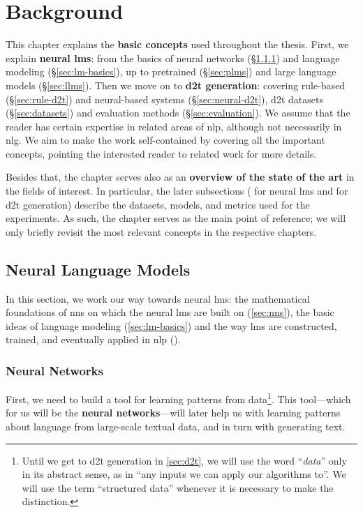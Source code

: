 
\chapter{Background}
\label{chap:background}

This chapter explains the \textbf{basic concepts} used throughout the thesis. First, we explain \textbf{neural \acp{lm}}: from the basics of neural networks (§\ref{sec:nns}) and language modeling (§\ref{sec:lm-basics}), up to pretrained (§\ref{sec:plms}) and large language models (§\ref{sec:llms}). Then we move on to \textbf{\ac{d2t} generation}: covering rule-based (§\ref{sec:rule-d2t}) and neural-based systems (§\ref{sec:neural-d2t}), \ac{d2t} datasets (§\ref{sec:datasets}) and evaluation methods (§\ref{sec:evaluation}). We assume that the reader has certain expertise in related areas of \ac{nlp}, although not necessarily in \ac{nlg}. We aim to make the work self-contained by covering all the important concepts, pointing the interested reader to related work for more details.

Besides that, the chapter serves also as an \textbf{overview of the state of the art} in the fields of interest. In particular, the later subsections ( for neural \acp{lm} and  for \ac{d2t} generation) describe the datasets, models, and metrics used for the experiments. As such, the chapter serves as the main point of reference; we will only briefly revisit the most relevant concepts in the respective chapters.


\section{Neural Language Models}
\label{sec:lms}
In this section, we work our way towards neural \acp{lm}: the mathematical foundations of \acp{nn} on which the neural \acp{lm} are built on (\autoref{sec:nns}), the basic ideas of language modeling (\autoref{sec:lm-basics}) and the way \acp{lm} are constructed, trained, and eventually applied in \ac{nlp} ().

\subsection{Neural Networks}
\label{sec:nns}
First, we need to build a tool for learning patterns from data\footnote{Until we get to \ac{d2t} generation in \autoref{sec:d2t}, we will use the word ``\textit{data}'' only in its abstract sense, as in ``any inputs we can apply our algorithms to''. We will use the term ``structured data'' whenever it is necessary to make the distinction.}. This tool---which for us will be the \textbf{neural networks}---will later help us with learning patterns about language from large-scale textual data, and in turn with generating text.

